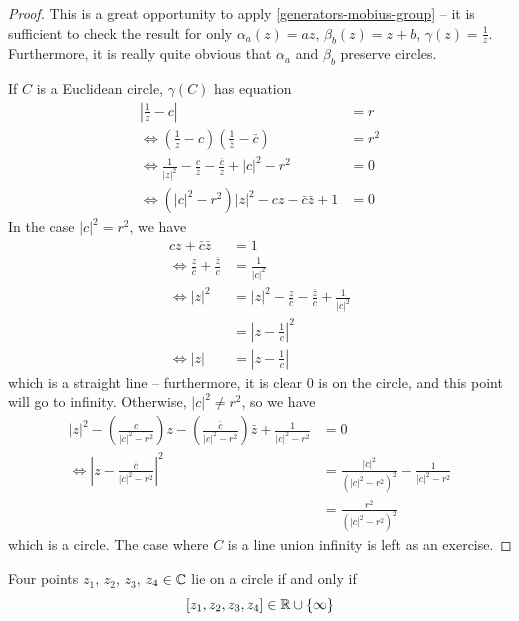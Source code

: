 \documentclass{../template/note}
\begin{document}
    \begin{proof}
        This is a great opportunity to apply \cref{generators-mobius-group} -- it is sufficient to check the result for only \(\alpha_a(z) = az\), \(\beta_b(z) = z + b\), \(\gamma(z) = \frac{1}{z}\). Furthermore, it is really quite obvious that \(\alpha_a\) and \(\beta_b\) preserve circles.

        If \(C\) is a Euclidean circle, \(\gamma(C)\) has equation
        \begin{align*}
            \left|\frac{1}{z} - c\right| &= r \\
            \iff \left(\frac{1}{z} - c\right)\left(\frac{1}{\bar z} - \bar c\right) &= r^2 \\
            \iff \frac{1}{|z|^2} - \frac{c}{\bar z} - \frac{\bar c}{z} + |c|^2 - r^2 &= 0 \\
            \iff (|c|^2 - r^2)|z|^2 - cz - \bar c \bar z + 1 &= 0
        \end{align*}
        In the case \(|c|^2 = r^2\), we have
        \begin{align*}
            cz + \bar c \bar z &= 1 \\
            \iff \frac{z}{\bar c} + \frac{\bar z}{c} &= \frac{1}{|c|^2} \\
            \iff |z|^2 &= |z|^2 - \frac{z}{\bar c} - \frac{\bar z}{c} + \frac{1}{|c|^2} \\
            &= \left|z-\frac{1}{c}\right|^2 \\
            \iff |z| &= \left|z - \frac{1}{c}\right|
        \end{align*}
        which is a straight line -- furthermore, it is clear 0 is on the circle, and this point will go to infinity. Otherwise, \(|c|^2 \neq r^2\), so we have
        \begin{align*}
            |z|^2 - \left(\frac{c}{|c|^2 - r^2}\right)z - \left(\frac{\bar c}{|c|^2 - r^2}\right) \bar z + \frac{1}{|c|^2 - r^2} &= 0 \\
            \iff \left|z - \frac{\bar c}{|c|^2 - r^2}\right|^2 &= \frac{|c|^2}{(|c|^2 - r^2)^2} - \frac{1}{|c|^2 - r^2} \\
            &= \frac{r^2}{(|c|^2 - r^2)^2}
        \end{align*}
        which is a circle. The case where \(C\) is a line union infinity is left as an exercise.        
    \end{proof}
    
    \begin{corollary}
        Four points \(z_1\), \(z_2\), \(z_3\), \(z_4 \in \mathbb C\) lie on a circle if and only if
        \[
            [z_1, z_2, z_3, z_4] \in \mathbb R \cup \{\infty\}
        \]
    \end{corollary}
    
\end{document}
